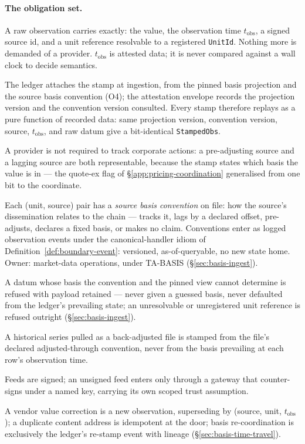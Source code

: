 \documentclass[11pt,a4paper]{article}
\begin{document}
\paragraph{The obligation set.}
\begin{description}[style=nextline]
\item[O1 (raw observation).] A raw observation carries exactly: the value, the
observation time $t_{\mathrm{obs}}$, a signed source id, and a unit reference
resolvable to a registered \texttt{UnitId}. Nothing more is demanded of a provider.
$t_{\mathrm{obs}}$ is attested data; it is never compared against a wall clock to
decide semantics.
\item[O2 (the stamp).] The ledger attaches the stamp at ingestion, from the pinned
basis projection and the source basis convention (O4); the attestation envelope
records the projection version and the convention version consulted. Every stamp
therefore replays as a pure function of recorded data: same projection version,
convention version, source, $t_{\mathrm{obs}}$, and raw datum give a bit-identical
\texttt{StampedObs}.
\item[O3 (no corporate-action awareness).] A provider is not required to track
corporate actions: a pre-adjusting source and a lagging source are both
representable, because the stamp states which basis the value is in --- the quote-ex
flag of \S\ref{app:pricing-coordination} generalised from one bit to the coordinate.
\item[O4 (source basis convention).] Each (unit, source) pair has a \emph{source
basis convention} on file: how the source's dissemination relates to the chain ---
tracks it, lags by a declared offset, pre-adjusts, declares a fixed basis, or makes
no claim. Conventions enter as logged observation events under the canonical-handler
idiom of Definition~\ref{def:boundary-event}: versioned, as-of-queryable, no new
state home. Owner: market-data operations, under TA-BASIS
(\S\ref{sec:basis-ingest}).
\item[O5 (fail-closed).] A datum whose basis the convention and the pinned view
cannot determine is refused with payload retained --- never given a guessed basis,
never defaulted from the ledger's prevailing state; an unresolvable or unregistered
unit reference is refused outright (\S\ref{sec:basis-ingest}).
\item[O6 (back-adjusted files).] A historical series pulled as a back-adjusted file
is stamped from the file's declared adjusted-through convention, never from the
basis prevailing at each row's observation time.
\item[O7 (signature).] Feeds are signed; an unsigned feed enters only through a
gateway that counter-signs under a named key, carrying its own scoped trust
assumption.
\item[O8 (corrections).] A vendor value correction is a new observation, superseding
by (source, unit, $t_{\mathrm{obs}}$); a duplicate content address is idempotent at
the door; basis re-coordination is exclusively the ledger's re-stamp event with
lineage (\S\ref{sec:basis-time-travel}).
\end{description}
\end{document}
